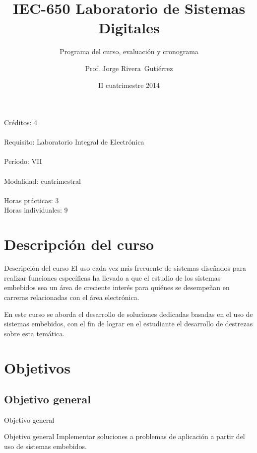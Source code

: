 \documentclass[handout,xcolor=dvipsnames]{beamer}
\title[IEC-650]{IEC-650 Laboratorio de Sistemas Digitales}
\subtitle{Programa del curso, evaluación y cronograma}
\author{Prof. Jorge Rivera~Guti\'errez}
\institute{Universidad Latina de Costa Rica\\ Ingenier\'\i a en Electr\'onica}
\date{II cuatrimestre 2014}
\newcommand{\pageframe}[1]{\frame{\begin{center}{ \Huge #1 }\end{center}}}
\begin{document}
\begin{frame}
 \maketitle
\end{frame}

\begin{frame}
 \begin{center}
  \Large Créditos: 4\\~\\
  Requisito: Laboratorio Integral de Electr\'onica\\~\\
  Período: VII\\~\\
  Modalidad: cuatrimestral\\~\\
  Horas pr\'acticas: 3\\
  Horas individuales: 9
 \end{center}
\end{frame}

\section{Descripción del curso}

\begin{frame}{Descripción del curso}
 El uso cada vez más frecuente de sistemas diseñados para realizar funciones específicas ha llevado a que el estudio de los sistemas embebidos sea un área de creciente interés para quiénes se desempeñan en carreras relacionadas con el área electrónica.

 En este curso se aborda el desarrollo de soluciones dedicadas basadas en el uso de sistemas embebidos, con el fin de lograr en el estudiante el desarrollo de destrezas sobre esta temática.
\end{frame}

\section{Objetivos}

\pageframe{Objetivos}

\subsection{Objetivo general}

\begin{frame}{Objetivo general}
  \begin{block}{Objetivo general}
    Implementar soluciones a problemas de aplicación a partir del uso de sistemas embebidos.
  \end{block}
\end{frame}
\end{document}
